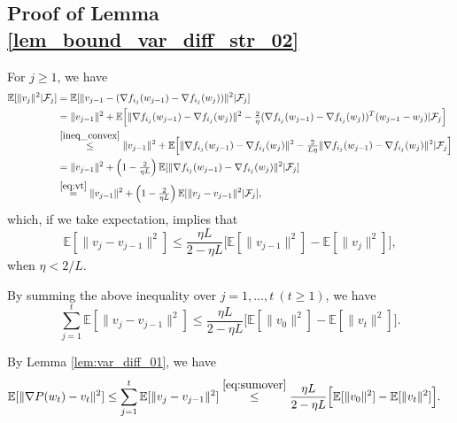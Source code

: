 \documentclass{article}
\renewcommand{\top}{T}
\begin{document}
\subsection{Proof of Lemma \ref{lem_bound_var_diff_str_02}}

For $j \geq 1$, we have
\begin{align*}
 \mathbb{E}[\| v_{j} \|^2 | \mathcal{F}_{j}] 
&= \mathbb{E}[\| v_{j-1} - (\nabla f_{i_{j}}(w_{j-1}) - \nabla f_{i_{j}}(w_{j}) ) \|^2 | \mathcal{F}_{j} ] 
\\ %
&= \|v_{j-1} \|^2 + \mathbb{E}\Big[\| \nabla f_{i_{j}}(w_{j-1}) - \nabla f_{i_{j}}(w_{j}) \|^2  
 - \tfrac{2}{\eta}(\nabla f_{i_{j}}(w_{j-1}) - \nabla f_{i_{j}}(w_{j}))^\top (w_{j-1} - w_{j}) | \mathcal{F}_{j} \Big] 
 \\ %
& \overset{\eqref{ineq_convex}}{\leq} \|v_{j-1} \|^2 + \mathbb{E}\Big[\| \nabla f_{i_{j}}(w_{j-1}) - \nabla f_{i_{j}}(w_{j}) \|^2 
- \tfrac{2}{L \eta} \| \nabla f_{i_{j}}(w_{j-1}) - \nabla f_{i_{j}}(w_{j}) \|^2 | \mathcal{F}_{j} \Big] 
\\ %
& = \|v_{j-1} \|^2 + \left(1 - \tfrac{2}{\eta L}\right) \mathbb{E} [ \| \nabla f_{i_{j}}(w_{j-1}) - \nabla f_{i_{j}}(w_{j}) \|^2 | \mathcal{F}_{j} ] \\
& \overset{\eqref{eq:vt}}{= } \|v_{j-1} \|^2 + \left(1 - \tfrac{2}{\eta L}\right) \mathbb{E} [ \| v_{j} - v_{j-1} \|^2 | \mathcal{F}_{j} ],
\end{align*}
which, if we take expectation, implies that
$$
\mathbb{E}[\| v_{j} - v_{j-1} \|^2] 
\leq \frac{\eta L}{2 - \eta L} \Big[ \mathbb{E}[ \|v_{j-1} \|^2] - \mathbb{E}[\| v_{j} \|^2] \Big], 
$$
when $\eta < 2/{L}$.

\quad By summing the above inequality over $j = 1,\dots, t\ (t\geq 1)$, we have
\begin{equation}\label{eq:sumover}
\sum_{j=1}^{t} \mathbb{E}[\| v_{j} - v_{j-1} \|^2] 
\leq \frac{\eta L}{2 - \eta L} \Big[ \mathbb{E}[ \|v_{0} \|^2] - \mathbb{E}[\| v_{t} \|^2] \Big].  
\end{equation}

By Lemma \ref{lem:var_diff_01}, we have
\begin{align*}
 \mathbb{E}[ \| \nabla P(w_{t}) - v_{t} \|^2 ] & \leq \sum_{j = 1}^{t} \mathbb{E}[ \| v_{j} - v_{j-1} \|^2 ]  \overset{\eqref{eq:sumover}}{\leq}  \frac{\eta L}{2 - \eta L} \Big[ \mathbb{E}[ \|v_{0} \|^2] - \mathbb{E}[\| v_{t} \|^2] \Big]. 
\end{align*}
\end{document}
